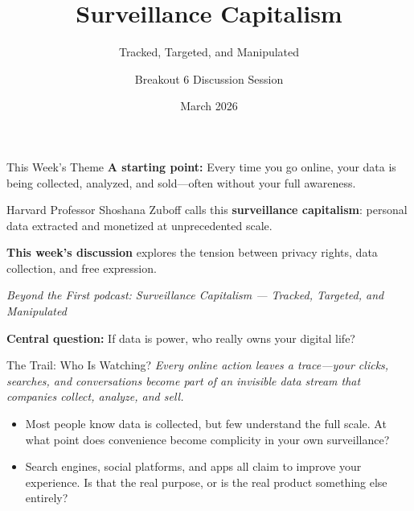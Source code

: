 \documentclass[aspectratio=169]{beamer}
\title{Surveillance Capitalism}
\subtitle{Tracked, Targeted, and Manipulated}
\author{Breakout 6 Discussion Session}
\date{March 2026}
\begin{document}
\begin{frame}
    \titlepage
\end{frame}
\begin{frame}{This Week's Theme}
    \large
    \textbf{A starting point:} Every time you go online, your data is being collected,
    analyzed, and sold---often without your full awareness.
    \vspace{0.4cm}

    Harvard Professor Shoshana Zuboff calls this \textbf{surveillance capitalism}:
    personal data extracted and monetized at unprecedented scale.
    \vspace{0.3cm}

    \textbf{This week's discussion} explores the tension between privacy rights,
    data collection, and free expression.
    \vspace{0.2cm}
    \begin{center}
        \textit{Beyond the First podcast: Surveillance Capitalism ---
        Tracked, Targeted, and Manipulated}
    \end{center}
    \vspace{0.1cm}

    \textbf{\textcolor{UGARed}{Central question:}}
    If data is power, who really owns your digital life?
\end{frame}
\begin{frame}{The Trail: Who Is Watching?}
    \normalsize
    \textit{Every online action leaves a trace---your clicks, searches, and conversations
    become part of an invisible data stream that companies collect, analyze, and sell.}
    \vspace{0.3cm}

    \begin{itemize}
        \setlength\itemsep{0.3cm}
        \item Most people know data is collected, but few understand the full scale.
              At what point does convenience become complicity in your own surveillance?
        \item Search engines, social platforms, and apps all claim to improve your experience.
              Is that the real purpose, or is the real product something else entirely?
    \end{itemize}
\end{frame}
\end{document}
